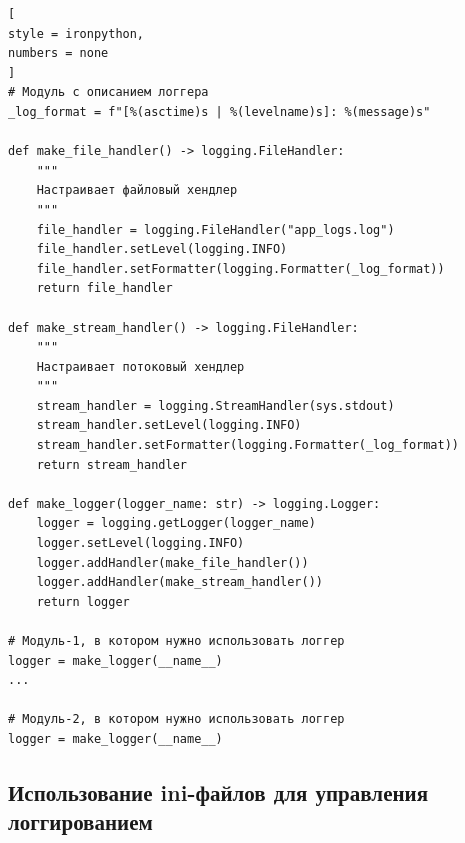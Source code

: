 \documentclass[%
	11pt,
	a4paper,
	utf8,
		]{article}
\begin{document}
\begin{lstlisting}[
style = ironpython,
numbers = none	
]
# Модуль с описанием логгера
_log_format = f"[%(asctime)s | %(levelname)s]: %(message)s"

def make_file_handler() -> logging.FileHandler:
	"""
	Настраивает файловый хендлер
	"""
	file_handler = logging.FileHandler("app_logs.log")
	file_handler.setLevel(logging.INFO)
	file_handler.setFormatter(logging.Formatter(_log_format))
	return file_handler

def make_stream_handler() -> logging.FileHandler:
	"""
	Настраивает потоковый хендлер
	"""
	stream_handler = logging.StreamHandler(sys.stdout)
	stream_handler.setLevel(logging.INFO)
	stream_handler.setFormatter(logging.Formatter(_log_format))
	return stream_handler

def make_logger(logger_name: str) -> logging.Logger:
	logger = logging.getLogger(logger_name)
	logger.setLevel(logging.INFO)
	logger.addHandler(make_file_handler())
	logger.addHandler(make_stream_handler())
	return logger

# Модуль-1, в котором нужно использовать логгер
logger = make_logger(__name__)
...

# Модуль-2, в котором нужно использовать логгер
logger = make_logger(__name__)
\end{lstlisting}


\subsection{Использование ini-файлов для управления логгированием}
\end{document}
